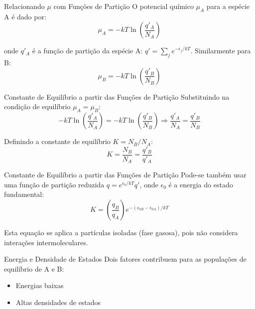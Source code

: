 \documentclass{beamer}
\begin{document}
\begin{frame}{Relacionando $\mu$ com Funções de Partição}
        O potencial químico $\mu_A$ para a espécie A é dado por:
        $$ \mu_A = -kT \ln\left(\frac{q'_A}{N_A}\right) $$
        
        onde $q'_A$ é a função de partição da espécie A: $q' = \sum_j e^{-\epsilon_j/kT}$. 
        Similarmente para B:
        $$ \mu_B = -kT \ln\left(\frac{q'_B}{N_B}\right) $$
        
\end{frame}

\begin{frame}{Constante de Equilíbrio a partir das Funções de Partição}
        Substituindo na condição de equilíbrio $\mu_A = \mu_B$:
        $$ -kT \ln\left(\frac{q'_A}{N_A}\right) = -kT \ln\left(\frac{q'_B}{N_B}\right) \Rightarrow \frac{q'_A}{N_A} = \frac{q'_B}{N_B} $$
        
        Definindo a constante de equilíbrio $K = N_B/N_A$:
        $$ K = \frac{N_B}{N_A} = \frac{q'_B}{q'_A} $$
        
\end{frame}


\begin{frame}{Constante de Equilíbrio a partir das Funções de Partição}
        Pode-se também usar uma função de partição reduzida $q = e^{\epsilon_0/kT}q'$, onde $\epsilon_0$ é a energia do estado fundamental:
        $$ K = \left(\frac{q_B}{q_A}\right) e^{-(\epsilon_{0B} - \epsilon_{0A})/kT} $$
        
        Esta equação se aplica a partículas isoladas (fase gasosa), pois não considera interações intermoleculares.
\end{frame}

\begin{frame}{Energia e Densidade de Estados}
        Dois fatores contribuem para as populações de equilíbrio de A e B:
        \begin{itemize}
            \item Energias baixas
            \item Altas densidades de estados
        \end{itemize}
        
\end{frame}
\end{document}
